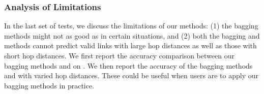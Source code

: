 


\subsubsection{Analysis of Limitations}
\label{subsction-exp-limit}
In the last set of tests, we discuss the limitations of our methods:
(1) the bagging methods might not as good as \NMF in certain situations, and (2) both the bagging
and \NMF methods cannot predict valid links with large hop distances as well as those with short hop distances.
We first report the accuracy comparison between our bagging methods and \NMF on \Flickr.
We then report the accuracy of the bagging methods and \NMF with varied hop distances.
These could be useful when users are to apply our bagging methods in practice.


